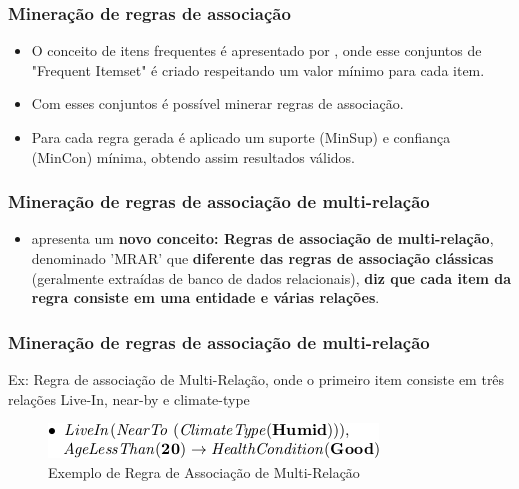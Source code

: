 \documentclass[hyperref={pdfpagelabels=false}]{beamer}
\begin{document}
\begin{frame}
\frametitle{Mineração de regras de associação}
\begin{itemize}	
      \item { O conceito de itens frequentes é apresentado por \cite{Agrawal1993}, onde esse conjuntos de "Frequent Itemset" é criado respeitando um valor mínimo para cada item. }
      \item { Com esses conjuntos é possível minerar regras de associação. }
	  \item { Para cada regra gerada é aplicado um suporte (MinSup) e confiança (MinCon) mínima, obtendo assim resultados válidos.  }
\end{itemize}	
\end{frame}


\begin{frame}
\frametitle{Mineração de regras de associação de multi-relação}
\begin{itemize}
  \item{ \cite{Ramezani2014} apresenta um \textbf{novo conceito: Regras de associação de multi-relação}, denominado 'MRAR' que \textbf{diferente das regras de associação clássicas} (geralmente extraídas  de banco de dados relacionais), \textbf{diz que cada item da regra consiste em uma entidade e várias relações}.  }
\end{itemize}
\end{frame}


\begin{frame}
\frametitle{Mineração de regras de associação de multi-relação}
Ex: Regra de associação de Multi-Relação, onde o primeiro item consiste em três relações Live-In, near-by e climate-type


	\begin{figure}[h]
	\centering
		\includegraphics[scale=0.8]{img/exemplo}
	\caption{ Exemplo de Regra de Associação de Multi-Relação}
	\label{fig:exemplo}
\end{figure}	

\end{frame}
\end{document}
